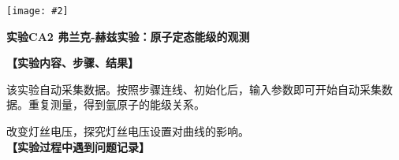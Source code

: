 \documentclass[11pt,a4paper]{ctexart}
\newcommand{\ExpeName}{实验CA2 弗兰克-赫兹实验：原子定态能级的观测}
\newcommand{\cpic}[2]{
\begin{center}
\texttt{[image: \#2]}
\end{center}
}
\begin{document}
\newpage%
\cpic{0.255}{e2}%
\begin{center}
\LARGE{\textbf{\ExpeName}}
\end{center}
\textbf{【实验内容、步骤、结果】}\par
该实验自动采集数据。按照步骤连线、初始化后，输入参数即可开始自动采集数据。重复测量，得到氩原子的能级关系。
\par
改变灯丝电压，探究灯丝电压设置对曲线的影响。
\newline 
\ 
\\
\textbf{【实验过程中遇到问题记录】}

%
\end{document}
